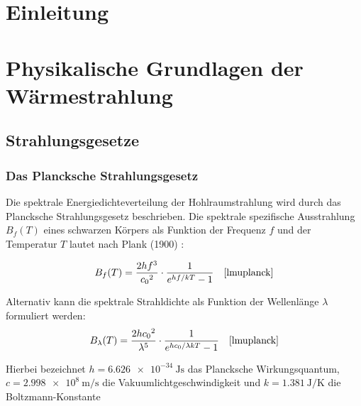 \documentclass[12pt,a4paper]{article}
\begin{document}



\setcounter{page}{2}
\tableofcontents
\newpage




\section{Einleitung}

\section{Physikalische Grundlagen der Wärmestrahlung}

\subsection{Strahlungsgesetze}

\subsubsection{Das Plancksche Strahlungsgesetz}
Die spektrale Energiedichteverteilung der Hohlraumstrahlung wird durch das Plancksche Strahlungsgesetz beschrieben.
Die spektrale spezifische Ausstrahlung $B_f(T)$ eines schwarzen Körpers als Funktion der Frequenz $f$ und der Temperatur $T$
lautet nach Plank (1900) \cite{plancknormalspektrum}\cite{plancknormalspektrumtheorie}:

\begin{equation}
  \label{Spektrale Strahldichte als Funktion der Wellenlänge}
    B_f(T) = \frac{2hf^3}{{c_0}^2} \cdot \frac{1}{e^{hf/kT}-1} \quad \text{\cite{lmuplanck}}
\end{equation}


Alternativ kann die spektrale Strahldichte als Funktion der Wellenlänge $\lambda$ formuliert werden:
\begin{equation}
  \label{Spektrale Strahldichte als Funktion der Wellenlänge}
    B_{\lambda}(T) = \frac{2h{c_0}^2}{\lambda^5}\cdot \frac{1}{e^{hc_0/\lambda kT}-1} \quad \text{\cite{lmuplanck}}
\end{equation}

Hierbei bezeichnet $h = \SI{6.626e-34}{\joule\second}$ das Plancksche Wirkungsquantum, $c = \SI{2.998e+8}{\meter\per\second}$
die Vakuumlichtgeschwindigkeit und $k = \SI{1.381}{\joule\per\kelvin}$ die Boltzmann-Konstante \cite{codata2018}
\end{document}
